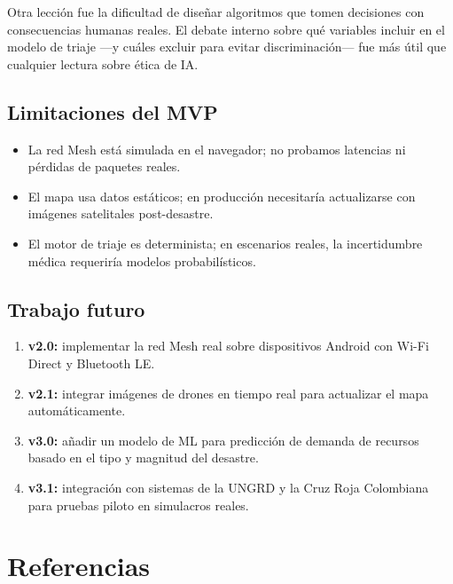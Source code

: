 \documentclass[12pt,a4paper]{article}
\begin{document}
Otra lección fue la dificultad de diseñar algoritmos que tomen decisiones
con consecuencias humanas reales. El debate interno sobre qué variables incluir
en el modelo de triaje ---y cuáles excluir para evitar discriminación--- fue
más útil que cualquier lectura sobre ética de IA.

\subsection{Limitaciones del MVP}

\begin{itemize}[leftmargin=1.5em]
  \item La red Mesh está simulada en el navegador; no probamos latencias ni
        pérdidas de paquetes reales.
  \item El mapa usa datos estáticos; en producción necesitaría actualizarse
        con imágenes satelitales post-desastre.
  \item El motor de triaje es determinista; en escenarios reales, la
        incertidumbre médica requeriría modelos probabilísticos.
\end{itemize}

\subsection{Trabajo futuro}

\begin{enumerate}[leftmargin=1.5em]
  \item \textbf{v2.0:} implementar la red Mesh real sobre dispositivos Android
        con Wi-Fi Direct y Bluetooth LE.
  \item \textbf{v2.1:} integrar imágenes de drones en tiempo real para
        actualizar el mapa automáticamente.
  \item \textbf{v3.0:} añadir un modelo de ML para predicción de demanda de
        recursos basado en el tipo y magnitud del desastre.
  \item \textbf{v3.1:} integración con sistemas de la UNGRD y la Cruz Roja
        Colombiana para pruebas piloto en simulacros reales.
\end{enumerate}

\section*{Referencias}
\end{document}

